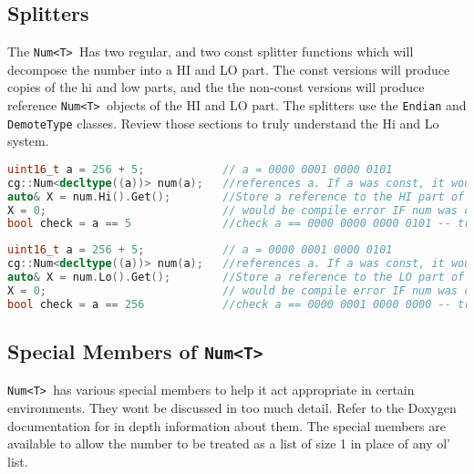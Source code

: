 \documentclass{article}
\newcommand{\theobj}{\protect\Verb+Num<T> +}
\begin{document}
\subsection{Splitters}

The \theobj Has two regular, and two const splitter functions which will decompose the number into a HI and LO part. The const versions will produce copies of the hi and low parts, and the the non-const versions will produce reference \theobj objects of the HI and LO part.  The splitters use the \Verb+Endian+ and \Verb+DemoteType+ classes. Review those sections to truly understand the Hi and Lo system.

\begin{lstlisting}[language=C++, label=code:9, caption=Hi members]
uint16_t a = 256 + 5;            // a = 0000 0001 0000 0101
cg::Num<decltype((a))> num(a);   //references a. If a was const, it would be a copy
auto& X = num.Hi().Get();        //Store a reference to the HI part of num in X, also references the HI part of a (for this example).  If a was const, it would not reference the Hi part of a, only num
X = 0;                           // would be compile error IF num was const.  If num 
bool check = a == 5              //check a == 0000 0000 0000 0101 -- true
\end{lstlisting}

\begin{lstlisting}[language=C++, label=code:9, caption=Lo members]
uint16_t a = 256 + 5;            // a = 0000 0001 0000 0101
cg::Num<decltype((a))> num(a);   //references a. If a was const, it would be a copy
auto& X = num.Lo().Get();        //Store a reference to the LO part of num in X, also references the Lo part of a (for this example).  If a was const, it would not reference the Lo part of a, only num
X = 0;                           // would be compile error IF num was const.  If num 
bool check = a == 256            //check a == 0000 0001 0000 0000 -- true
\end{lstlisting}

\pagebreak
\subsection{Special Members of \theobj}

\theobj has various special members to help it act appropriate in certain environments.  They wont be discussed in too much detail. Refer to the Doxygen documentation for in depth information about them.  The special members are available to allow the number to be treated as a list of size 1 in place of any ol' list.
\end{document}
